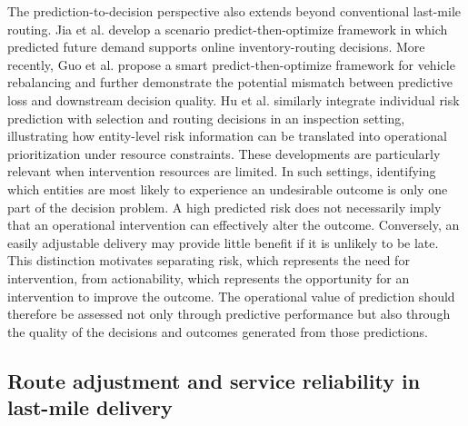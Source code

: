 \documentclass[11pt,a4paper]{article}
\begin{document}
The prediction-to-decision perspective also extends beyond conventional
last-mile routing. Jia et al. \cite{jia2025} develop a scenario
predict-then-optimize framework in which predicted future demand
supports online inventory-routing decisions. More recently, Guo et al.
\cite{guo2026} propose a smart predict-then-optimize framework for vehicle
rebalancing and further demonstrate the potential mismatch between
predictive loss and downstream decision quality. Hu et al. \cite{hu2026}
similarly integrate individual risk prediction with selection and
routing decisions in an inspection setting, illustrating how
entity-level risk information can be translated into operational
prioritization under resource constraints. These developments are
particularly relevant when intervention resources are limited. In such
settings, identifying which entities are most likely to experience an
undesirable outcome is only one part of the decision problem. A high
predicted risk does not necessarily imply that an operational
intervention can effectively alter the outcome. Conversely, an easily
adjustable delivery may provide little benefit if it is unlikely to be
late. This distinction motivates separating risk, which represents the
need for intervention, from actionability, which represents the
opportunity for an intervention to improve the outcome. The operational
value of prediction should therefore be assessed not only through
predictive performance but also through the quality of the decisions and
outcomes generated from those predictions.

\subsection{Route adjustment and service reliability in last-mile delivery}\label{sec:lit-route-adjustment}
\end{document}
